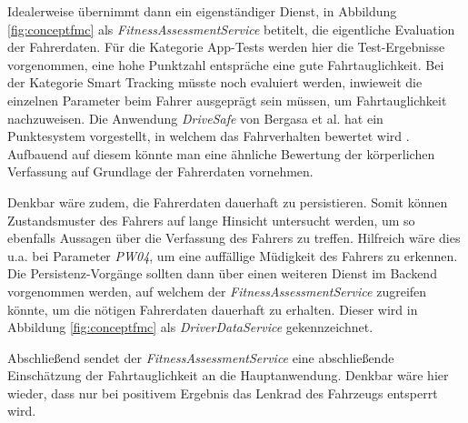Idealerweise übernimmt dann ein eigenständiger Dienst, in Abbildung \ref{fig:conceptfmc} als \textit{FitnessAssessmentService} betitelt, die eigentliche Evaluation der Fahrerdaten. Für die Kategorie App-Tests werden hier die Test-Ergebnisse vorgenommen, eine hohe Punktzahl entspräche eine gute Fahrtauglichkeit. Bei der Kategorie Smart Tracking müsste noch evaluiert werden, inwieweit die einzelnen Parameter beim Fahrer ausgeprägt sein müssen, um Fahrtauglichkeit nachzuweisen. Die Anwendung \textit{DriveSafe} von Bergasa et al. hat ein Punktesystem vorgestellt, in welchem das Fahrverhalten bewertet wird \cite{drivesafe}. Aufbauend auf diesem könnte man eine ähnliche Bewertung der körperlichen Verfassung auf Grundlage der Fahrerdaten vornehmen. 

Denkbar wäre zudem, die Fahrerdaten dauerhaft zu persistieren. Somit können Zustandsmuster des Fahrers auf lange Hinsicht untersucht werden, um so ebenfalls Aussagen über die Verfassung des Fahrers zu treffen. Hilfreich wäre dies u.a. bei Parameter \textit{PW04}, um eine auffällige Müdigkeit des Fahrers zu erkennen. Die Persistenz-Vorgänge sollten dann über einen weiteren Dienst im Backend vorgenommen werden, auf welchem der \textit{FitnessAssessmentService} zugreifen könnte, um die nötigen Fahrerdaten dauerhaft zu erhalten. Dieser wird in Abbildung \ref{fig:conceptfmc} als \textit{DriverDataService} gekennzeichnet.

Abschließend sendet der \textit{FitnessAssessmentService} eine abschließende Einschätzung der Fahrtauglichkeit an die Hauptanwendung. Denkbar wäre hier wieder, dass nur bei positivem Ergebnis das Lenkrad des Fahrzeugs entsperrt wird. 
